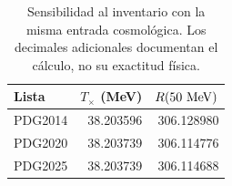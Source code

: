 \begin{table}[t]\centering\small
\caption{Sensibilidad al inventario con la misma entrada cosmológica. Los decimales adicionales documentan el cálculo, no su exactitud física.}
\label{tab:crosscatalogs}
\begin{tabular}{lrr}\toprule
Lista & $T_\times$ (MeV) & $R(50\ {\rm MeV})$\\\midrule
PDG2014 & 38.203596 & 306.128980\\
PDG2020 & 38.203739 & 306.114776\\
PDG2025 & 38.203739 & 306.114688\\
\bottomrule\end{tabular}
\end{table}
